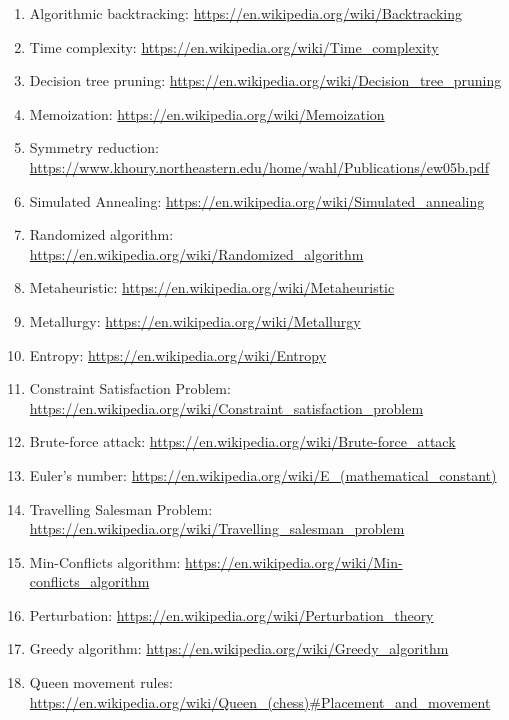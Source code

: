 \documentclass{article}
\begin{document}
\sloppy
\begin{enumerate}
    \item Algorithmic backtracking: \url{https://en.wikipedia.org/wiki/Backtracking}
    \item Time complexity: \url{https://en.wikipedia.org/wiki/Time_complexity}
    \item Decision tree pruning: \url{https://en.wikipedia.org/wiki/Decision_tree_pruning}
    \item Memoization: \url{https://en.wikipedia.org/wiki/Memoization}
    \item Symmetry reduction: \url{https://www.khoury.northeastern.edu/home/wahl/Publications/ew05b.pdf}
    \item Simulated Annealing: \url{https://en.wikipedia.org/wiki/Simulated_annealing}
    \item Randomized algorithm: \url{https://en.wikipedia.org/wiki/Randomized_algorithm}
    \item Metaheuristic: \url{https://en.wikipedia.org/wiki/Metaheuristic}
    \item Metallurgy: \url{https://en.wikipedia.org/wiki/Metallurgy}
    \item Entropy: \url{https://en.wikipedia.org/wiki/Entropy}
    \item Constraint Satisfaction Problem: \url{https://en.wikipedia.org/wiki/Constraint\_satisfaction\_problem}
    \item Brute-force attack: \url{https://en.wikipedia.org/wiki/Brute-force_attack}
    \item Euler's number: \url{https://en.wikipedia.org/wiki/E_(mathematical_constant)}
    \item Travelling Salesman Problem: \url{https://en.wikipedia.org/wiki/Travelling_salesman_problem}
    \item Min-Conflicts algorithm: \url{https://en.wikipedia.org/wiki/Min-conflicts_algorithm}
    \item Perturbation: \url{https://en.wikipedia.org/wiki/Perturbation_theory}
    \item Greedy algorithm: \url{https://en.wikipedia.org/wiki/Greedy_algorithm}
    \item Queen movement rules: \url{https://en.wikipedia.org/wiki/Queen_(chess)\#Placement\_and\_movement}
\end{enumerate}
\end{document}
